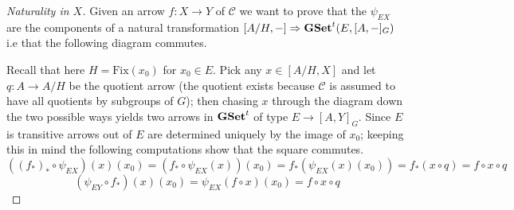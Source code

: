 \documentclass[italian, 12pt, reqno]{article}
\theoremstyle{myteo}
\numberwithin{equation}{section}
\newcommand{\cat}[1]{\mathscr{#1}}
\newcommand{\tgset}{\text{\textbf{GSet}}^t}
\newcommand{\fix}[1]{\text{Fix}(#1)}
\newcommand{\homs}[2]{[#1, #2]}
\newcommand{\fun}[3]{#1\colon#2\to #3}
\begin{document}
\begin{proof}[Naturality in \(X\)]
  \label{proof:naturality_in_X}
  Given an arrow \(\fun{f}{X}{Y}\) of \(\cat{C}\) we want to prove that the \(\psi_{EX}\) are the components of a natural transformation \(\homs{A/H}{-}\Rightarrow \tgset(E, \homs{A}{-}_G)\) i.e that the following diagram commutes.
  \begin{center}
  \end{center}
  Recall that here \(H = \fix{x_0}\) for \(x_0\in E\).
  Pick any \(x\in \homs{A/H}{X}\) and let \(\fun{q}{A}{A/H}\) be the quotient arrow (the quotient exists because \(\cat{C}\) is assumed to have all quotients by subgroups of \(G\)); then chasing \(x\) through the diagram down the two possible ways yields two arrows in \(\tgset\) of type \(E\to\homs{A}{Y}_G\).
  Since \(E\) is transitive arrows out of \(E\) are determined uniquely by the image of \(x_0\); keeping this in mind the following computations show that the square commutes.
  \[((f_*)_*\circ \psi_{EX})(x)(x_0) = (f_*\circ \psi_{EX}(x))(x_0) = f_*(\psi_{EX}(x)(x_0)) = f_*(x\circ q) = f\circ x\circ q\]
  \[(\psi_{EY}\circ f_*)(x)(x_0) = \psi_{EX}(f\circ x)(x_0) = f\circ x\circ q\]
\end{proof}
\end{document}
